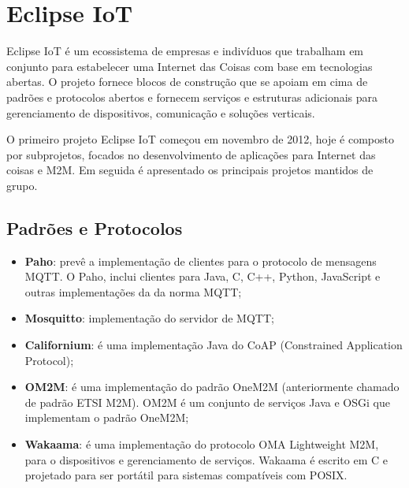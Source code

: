 \section{Eclipse IoT}

Eclipse IoT é um ecossistema de empresas e indivíduos que trabalham
em conjunto para estabelecer uma Internet das Coisas com base em tecnologias
abertas\cite{eclipse:iot}. O projeto fornece blocos de construção
que se apoiam em cima de padrões e protocolos abertos e fornecem serviços
e estruturas adicionais para gerenciamento de dispositivos, comunicação
e soluções verticais.

O primeiro projeto Eclipse IoT começou em novembro de 2012, hoje é
composto por subprojetos, focados no desenvolvimento de aplicações
para Internet das coisas e M2M. Em seguida é apresentado os principais
projetos mantidos de grupo.

\subsection{Padrões e Protocolos}
\begin{itemize}
\item \textbf{Paho}: prevê a implementação de clientes para o protocolo
de mensagens MQTT. O Paho, inclui clientes para Java, C, C++, Python,
JavaScript e outras implementações da da norma MQTT;
\item \textbf{Mosquitto}: implementação do servidor de MQTT;
\item \textbf{Californium}: é uma implementação Java do CoAP (Constrained
Application Protocol);
\item \textbf{OM2M}: é uma implementação do padrão OneM2M\cite{swetina2014toward}
(anteriormente chamado de padrão ETSI M2M). OM2M é um conjunto de
serviços Java e OSGi que implementam o padrão OneM2M;
\item \textbf{Wakaama}: é uma implementação do protocolo OMA Lightweight
M2M, para o dispositivos e gerenciamento de serviços. Wakaama é escrito
em C e projetado para ser portátil para sistemas compatíveis com POSIX.
\end{itemize}


